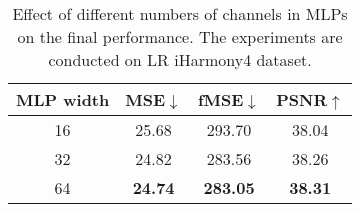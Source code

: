\documentclass[10pt,journal,twocolumn,twoside]{IEEEtran}
\begin{document}
\begin{table}[!t]
\caption{Demonstration that the HINet does not rely on 3D LUT prediction. The experiments are conducted on LR iHarmony4.}
    \label{tab:LUT}
    \renewcommand{\arraystretch}{0.9} 
    \centering

\end{table}

\begin{table}[t]
\caption{Effect of different numbers of channels in MLPs on the final performance. The experiments are conducted on LR iHarmony4 dataset.}
    \label{tab:MLP width}
\centering
\begin{tabular}{c|ccc}
\hline
MLP width & MSE$\downarrow$                       & fMSE$\downarrow$                       & PSNR$\uparrow$                      \\ \hline
16        & 25.68                     & 293.70                      & 38.04                     \\
32        & \multicolumn{1}{c}{24.82} & \multicolumn{1}{c}{283.56} & \multicolumn{1}{c}{38.26} \\
64        & \textbf{24.74}            & \textbf{283.05}            & \textbf{38.31}            \\ \hline
\end{tabular}
    
\end{table}
\end{document}
